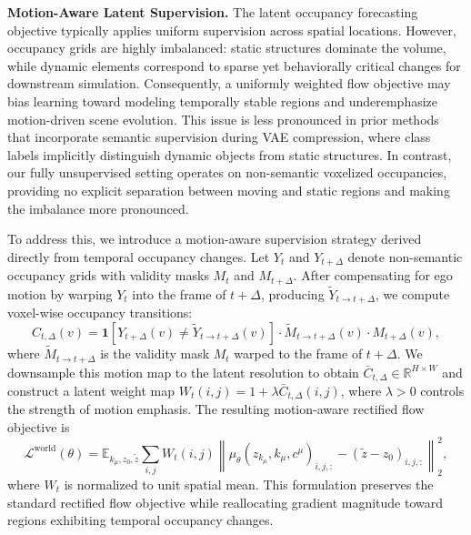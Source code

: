 \documentclass[runningheads]{llncs}
\begin{document}
\textbf{Motion-Aware Latent Supervision.} The latent occupancy forecasting objective typically applies uniform supervision across spatial locations. However, occupancy grids are highly imbalanced: static structures dominate the volume, while dynamic elements correspond to sparse yet behaviorally critical changes for downstream simulation. Consequently, a uniformly weighted flow objective may bias learning toward modeling temporally stable regions and underemphasize motion-driven scene evolution. This issue is less pronounced in prior methods that incorporate semantic supervision during VAE compression, where class labels implicitly distinguish dynamic objects from static structures. In contrast, our fully unsupervised setting operates on non-semantic voxelized occupancies, providing no explicit separation between moving and static regions and making the imbalance more pronounced.

To address this, we introduce a motion-aware supervision strategy derived directly from temporal occupancy changes. Let $Y_t$ and $Y_{t+\Delta}$ denote non-semantic occupancy grids with validity masks $M_t$ and $M_{t+\Delta}$. After compensating for ego motion by warping $Y_t$ into the frame of $t+\Delta$, producing $\tilde{Y}_{t\rightarrow t+\Delta}$, we compute voxel-wise occupancy transitions:
\begin{equation*}
C_{t,\Delta}(v) = \mathbf{1}[Y_{t+\Delta}(v) \neq \tilde{Y}_{t\rightarrow t+\Delta}(v)]
\cdot \tilde{M}_{t\rightarrow t+\Delta}(v)
\cdot M_{t+\Delta}(v),
\end{equation*}
where $\tilde{M}_{t\rightarrow t+\Delta}$ is the validity mask $M_t$ warped to the frame of $t+\Delta$. We downsample this motion map to the latent resolution to obtain $\bar{C}_{t,\Delta} \in \mathbb{R}^{H \times W}$ and construct a latent weight map $W_t(i,j) = 1 + \lambda \bar{C}_{t,\Delta}(i,j)$,
where $\lambda > 0$ controls the strength of motion emphasis. The resulting motion-aware rectified flow objective is
\begin{equation*}
\mathcal{L}^{\text{world}}(\theta)
=
\mathbb{E}_{k_\mu, z_0, \tilde{z}}
\sum_{i,j}
W_t(i,j)
\left\|
\mu_\theta(z_{k_\mu}, {k_\mu}, c^\mu)_{i,j,:}
-
(\tilde{z}-z_0)_{i,j,:}
\right\|_2^2 ,
\end{equation*}
where $W_t$ is normalized to unit spatial mean. This formulation preserves the standard rectified flow objective while reallocating gradient magnitude toward regions exhibiting temporal occupancy changes.


\vspace{-2mm}
\end{document}
